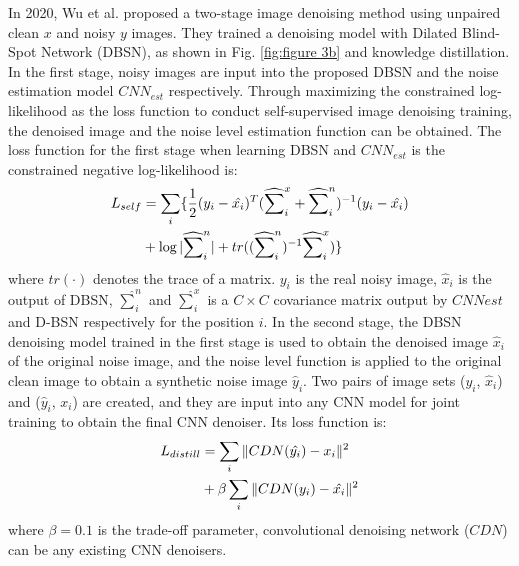 \documentclass[conference]{IEEEtran}
\begin{document}
In 2020, Wu et al. \cite{wu2020unpaired} proposed a two-stage image denoising method using unpaired clean $x$ and noisy $y$ images. They trained a denoising model with Dilated Blind-Spot Network (DBSN), as shown in Fig. \ref{fig:figure 3b} and knowledge distillation. 
In the first stage, noisy images are input into the proposed DBSN and the noise estimation model $CNN_{est}$ respectively. Through maximizing the constrained log-likelihood as the loss function to conduct self-supervised image denoising training, the denoised image and the noise level estimation function can be obtained. 
The loss function for the first stage when learning DBSN and $CNN_{est}$ is the constrained negative log-likelihood is:
\begin{equation}
	\setlength{\abovedisplayskip}{0pt}
	\setlength{\belowdisplayskip}{0pt}
	\begin{aligned}
		L_{self} &= \sum_{i} \{\frac{1}{2}(y_i-\hat{x_i})^T(\widehat{\sum}_{i}^{x} + \widehat{\sum}_{i}^{n})^{-1}(y_i -\hat{x_i}) \\
		&+ \log |\widehat{\sum}_{i}^{n}| + tr((\widehat{\sum}_{i}^{n})^{-1}\widehat{\sum}_{i}^{x}) \}
	\end{aligned}
	\label{eq:DBSN_1}
\end{equation}
where $tr(\cdot)$ denotes the trace of a matrix. $y_i$ is the real noisy image, $\hat{x}_i$ is the output of DBSN, $\widehat{\sum}_{i}^{n}$ and $\widehat{\sum}_{i}^{x}$ is a $C \times C$ covariance matrix output by $CNNest$ and D-BSN respectively for the position $i$. 
In the second stage, the DBSN denoising model trained in the first stage is used to obtain the denoised image $\hat{x}_i$ of the original noise image, and the noise level function is applied to the original clean image to obtain a synthetic noise image $\hat{y}_i$. Two pairs of image sets ($y_i$, $\hat{x}_i$) and ($\hat{y}_i$, $x_i$) are created, and they are input into any CNN model for joint training to obtain the final CNN denoiser. Its loss function is:
\begin{equation}
	\setlength{\abovedisplayskip}{0pt}
	\setlength{\belowdisplayskip}{0pt}
	\begin{aligned}
		L_{distill} &= \sum_{i} \Vert CDN(\hat{y_i}) - x_i \Vert^2 \\
		&+ \beta \sum_{i} \Vert CDN(y_i) -\hat{x_i} \Vert^2
	\end{aligned}
	\label{eq:DBSN_4}
\end{equation}
where $\beta = 0.1$ is the trade-off parameter, convolutional denoising network ($CDN$) can be any existing CNN denoisers.
\end{document}
